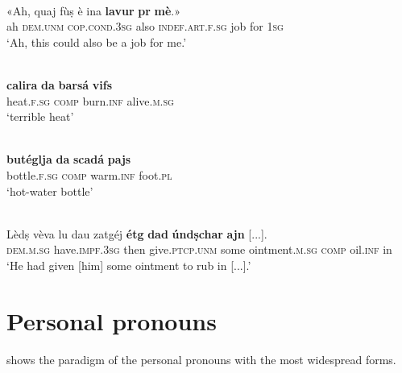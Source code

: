 \ea\label{}
\\
	\gll «Ah, quaj fùṣ è ina \textbf{lavur} \textbf{pr} \textbf{mè}.»\\
	ah \textsc{dem.unm} \textsc{cop.cond.3sg} also \textsc{indef.art.f.sg} job for \textsc{1sg} \\
\glt `Ah, this could also be a job for me.'
\z

\ea\label{}
\\
\gll  \textbf{calira} \textbf{da} \textbf{barsá} \textbf{vifs} \\
heat.\textsc{f.sg} \textsc{comp} burn.\textsc{inf} alive.\textsc{m.sg}\\
\glt `terrible heat'
\z

\ea\label{}
\\
\gll   \textbf{butéglja} \textbf{da} \textbf{scadá} \textbf{pajs} \\
bottle.\textsc{f.sg} \textsc{comp} warm.\textsc{inf} foot.\textsc{pl} \\
\glt `hot-water bottle'
\z

\ea
\label{}
\\
\gll  Lèdṣ vèva lu dau zatgéj \textbf{étg} \textbf{dad} \textbf{úndṣchar} \textbf{ajn} [...]. \\
\textsc{dem.m.sg} have.\textsc{impf.3sg} then  give.\textsc{ptcp.unm} some ointment.\textsc{m.sg} \textsc{comp} oil.\textsc{inf} in\\
\glt `He had given [him] some ointment to rub in [...].'
\z

\section{Personal pronouns}
 shows the paradigm of the personal pronouns with the most widespread forms.

